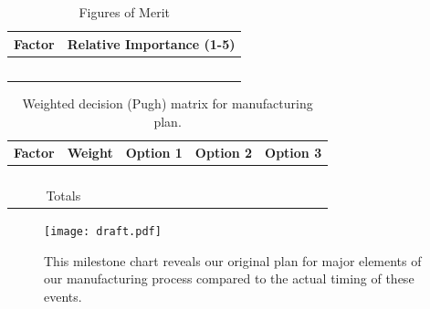 \documentclass[report]{byu-aero}
\begin{document}
\begin{table}[h!]
	\centering
	\caption{Figures of Merit}
	\label{tab:fomman}
	\begin{tabular}{ |c|c| } 
		\hline
		\rowcolor{BYUbluemid}
    	Factor & Relative Importance (1-5) \\ 
		\hline
	     &  \\ 
		\hline
		 &  \\ 
		\hline
		 &  \\ 
		\hline
		 &  \\ 
		\hline
		 &  \\ 
		\hline
	\end{tabular}
\end{table}


\begin{table}[h!]
	\centering
	\caption{Weighted decision (Pugh) matrix for manufacturing plan.}
	\label{tab:decisionmatrixmanufacturing}
	\begin{tabular}{ |c|c|c|c|c| } 
		\hline
		\rowcolor{BYUbluemid}
    	Factor & Weight & Option 1 & Option 2 & Option 3 \\ 
		\hline
	     &  &  &  &  \\ 
		\hline
		 &  &  &  &  \\ 
		\hline
		 &  &  &  &  \\ 
		\hline
		 &  &  &  &  \\ 
		\hline
		\multicolumn{2}{|c|}{Totals} &  &  &  \\ %
		\hline
	\end{tabular}
\end{table}


\begin{figure}[h!]
	\centering
	\texttt{[image: draft.pdf]}
	\caption{This milestone chart reveals our original plan for major elements of our manufacturing process compared to the actual timing of these events.}
	\label{fig:plannedvsactualtimingmanufacturing}
\end{figure}



\end{document}
